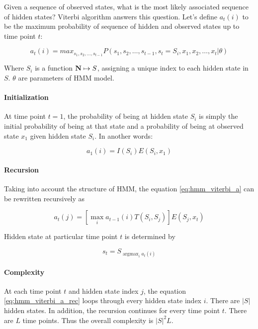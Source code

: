 \documentclass[thesis=B,english]{FITthesis}[2012/06/26]
\DeclareMathOperator*{\argmax}{argmax} %
\begin{document}
Given a sequence of observed states, what is the most likely associated sequence of hidden states? Viterbi algorithm answers this question. Let's define $a_t(i)$ to be the maximum probability of sequence of hidden and observed states up to time point $t$:

\begin{equation} \label{eq:hmm_viterbi_a}
a_t(i) = max_{s_1,s_2,\dots,s_{t-1}} P(s_1,s_2,\dots,s_{t-1},s_t = S_i,x_1,x_2,\dots,x_t | \theta)
\end{equation}

Where $S_i$ is a function $\textbf N \mapsto S$, assigning a unique index to each hidden state in $S$. $\theta$ are parameters of HMM model.

\paragraph{Initialization}

At time point $t=1$, the probability of being at hidden state $S_i$ is simply the initial probability of being at that state and a probability of being at observed state $x_1$ given hidden state $S_i$. In another words:

\begin{equation}
a_1(i) = I(S_i)E(S_i,x_1)
\end{equation}

\paragraph{Recursion}
Taking into account the structure of HMM, the equation \ref{eq:hmm_viterbi_a} can be rewritten recursively as

\begin{equation} \label{eq:hmm_viterbi_a_rec}
a_t(j) = [\max_i a_{t-1}(i)T(S_i,S_j)] E(S_j,x_t)
\end{equation}

Hidden state at particular time point $t$ is determined by

\begin{equation}
s_t = S_{\argmax_i a_{t}(i)}
\end{equation}

\paragraph{Complexity}

At each time point $t$ and hidden state index $j$, the equation \ref{eq:hmm_viterbi_a_rec} loops through every hidden state index $i$. There are $\vert{S}\vert$ hidden states. In addition, the recursion continues for every time point $t$. There are $L$ time points. Thus the overall complexity is
${\vert{S}\vert}^2 L$.
\end{document}
